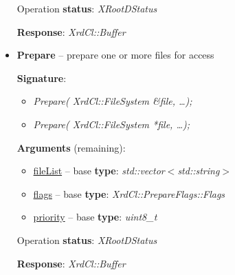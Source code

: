 \documentclass{article}
\begin{document}
\begin{itemize}
\begin{samepage}
                    Operation \textbf{status}: \textit{XRootDStatus}

                    \textbf{Response}: \textit{XrdCl::Buffer}
                    
                \end{samepage}
                    
                \item \begin{samepage} \textbf{Prepare} -- prepare one or more files for access

                    \textbf{Signature}:
                    \begin{itemize}
                        \item \textit{Prepare( XrdCl::FileSystem \&file, \ldots);}
                        \item \textit{Prepare( XrdCl::FileSystem *file, \ldots );}
                    \end{itemize}

                    \textbf{Arguments} (remaining):
                    \begin{itemize}
                        \item \underline{fileList} -- base \textbf{type}: \textit{std::vector$<$std::string$>$}
                        \item \underline{flags} -- base \textbf{type}: \textit{XrdCl::PrepareFlags::Flags}
                        \item \underline{priority} -- base \textbf{type}: \textit{uint8_t}
                    \end{itemize}

                    Operation \textbf{status}: \textit{XRootDStatus}

                    \textbf{Response}: \textit{XrdCl::Buffer}
                    
                \end{samepage}
                    
                    
            \end{itemize}
	    
\end{document}
